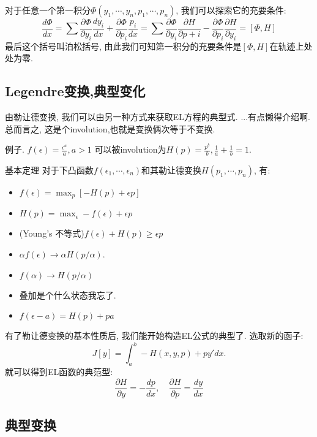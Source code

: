 对于任意一个第一积分\(\Phi(y_1,\cdots,y_n, p_1,\cdots,p_n)\), 我们可以探索它的充要条件: 
\begin{equation}
    \frac{d\Phi}{dx} 
    = \sum  \frac{\partial \Phi}{\partial y_i}\frac{dy_i}{dx}
        +   \frac{\partial \Phi}{\partial p_i}\frac{p_i}{dx} 
    = \sum  \frac{\partial \Phi}{\partial y_i}\frac{\partial H}{\partial p+i}
        -   \frac{\partial \Phi}{\partial p_i}\frac{\partial H}{\partial y_i}
    = [\Phi,H]
\end{equation}
最后这个括号叫泊松括号, 由此我们可知第一积分的充要条件是\([\Phi,H]\)在轨迹上处处为零. 

\subsection{Legendre变换,典型变化}

由勒让德变换, 我们可以由另一种方式来获取EL方程的典型式. ...有点懒得介绍啊. 总而言之,
这是个involution,也就是变换俩次等于不变换. 

例子. \(f(\epsilon) = \frac{\epsilon^a}{a}, a>1\) 
可以被involution为\(H(p) = \frac{p^b}{b}, \frac{1}{a}+\frac{1}{b} = 1\). 

\begin{thm}基本定理
    对于下凸函数\(f(\epsilon_1, \cdots, \epsilon_n)\)和其勒让德变换\(H(p_1,\cdots,p_n)\), 有:
    \begin{itemize}
        \item $f(\epsilon) = \max_p[- H(p) + \epsilon p]$
        \item \(H(p) = \max_{\epsilon} -f(\epsilon) + \epsilon p\)
        \item (Young's 不等式)\(f(\epsilon) + H(p) \ge \epsilon p\)
        \item \(\alpha f(\epsilon) \to \alpha H(p/\alpha)\). 
        \item \(f(\alpha) \to H(p/\alpha)\)
        \item 叠加是个什么状态我忘了. 
        \item \(f(\epsilon - a) = H(p) + pa\)
    \end{itemize}
\end{thm}

有了勒让德变换的基本性质后, 我们能开始构造EL公式的典型了.
选取新的函子:
\[J[y] = \int_a^b -H(x,y,p) + py' dx.\]
就可以得到EL函数的典范型: 
\[\frac{\partial H}{\partial y} = - \frac{dp}{dx}, \quad \frac{\partial H}{\partial p} = \frac{dy}{dx}\]


\subsection{典型变换}

